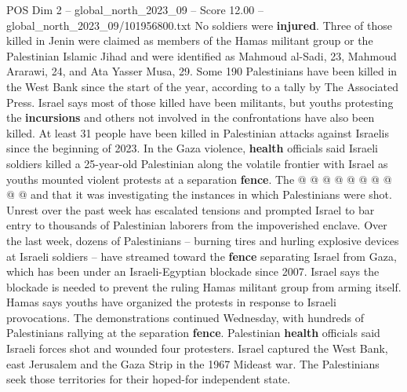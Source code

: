 \begin{textsample}{POS Dim 2 – global\_north\_2023\_09 – Score 12.00 – global\_north\_2023\_09/101956800.txt}
No soldiers were \textbf{injured}.
Three of those killed in Jenin were claimed as members of the Hamas militant group or the Palestinian Islamic Jihad and were identified as Mahmoud al-Sadi, 23, Mahmoud Ararawi, 24, and Ata Yasser Musa, 29.
Some 190 Palestinians have been killed in the West Bank since the start of the year, according to a tally by The Associated Press.
Israel says most of those killed have been militants, but youths protesting the \textbf{incursions} and others not involved in the confrontations have also been killed.
At least 31 people have been killed in Palestinian attacks against Israelis since the beginning of 2023.
In the Gaza violence, \textbf{health} officials said Israeli soldiers killed a 25-year-old Palestinian along the volatile frontier with Israel as youths mounted violent protests at a separation \textbf{fence}.
The @ @ @ @ @ @ @ @ @ @ and that it was investigating the instances in which Palestinians were shot.
Unrest over the past week has escalated tensions and prompted Israel to bar entry to thousands of Palestinian laborers from the impoverished enclave.
Over the last week, dozens of Palestinians -- burning tires and hurling explosive devices at Israeli soldiers -- have streamed toward the \textbf{fence} separating Israel from Gaza, which has been under an Israeli-Egyptian blockade since 2007.
Israel says the blockade is needed to prevent the ruling Hamas militant group from arming itself.
Hamas says youths have organized the protests in response to Israeli provocations.
The demonstrations continued Wednesday, with hundreds of Palestinians rallying at the separation \textbf{fence}.
Palestinian \textbf{health} officials said Israeli forces shot and wounded four protesters.
Israel captured the West Bank, east Jerusalem and the Gaza Strip in the 1967 Mideast war.
The Palestinians seek those territories for their hoped-for independent state.

\end{textsample}
